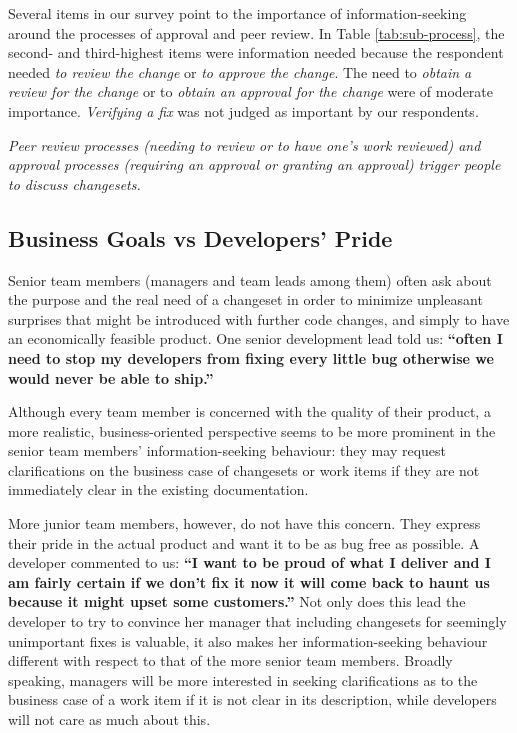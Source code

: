 \documentclass{sig-alternate}
\newenvironment{note}%
{\medskip
\noindent
\vspace{2pt}
\let\emph=\textbf
\begin{boxedminipage}{.99\columnwidth}\em}%
{\end{boxedminipage}}
\begin{document}
Several items in our survey point to the importance of information-seeking around the processes of approval and peer review. In Table \ref{tab:sub-process}, the second- and third-highest items were information needed because the respondent needed \emph{to review the change} or \emph{to approve the change}. The need to  \emph{obtain a review for the change} or to \emph{obtain an approval for the change} were of moderate importance. \emph{Verifying a fix} was not judged as important by our respondents.

\begin{note}
Peer review processes (needing to review or to have one's work reviewed) and approval processes (requiring an approval or granting an approval) trigger people to discuss changesets.
\end{note}


\subsection{Business Goals vs Developers' Pride}

Senior team members (managers and team leads among them) often ask about the purpose and the real need of a changeset in order to minimize unpleasant surprises that might be introduced with further code changes, and simply to have an economically feasible product. One senior development lead told us: \emph{``often I need to stop my developers from fixing every little bug otherwise we would never be able to ship.''}

Although every team member is concerned with the quality of their product, a more realistic, business-oriented perspective seems to be more prominent in the senior team members' information-seeking behaviour: they may request clarifications on the business case of changesets or work items if they are not immediately clear in the existing documentation.

More junior team members, however, do not have this concern. They express their pride in the actual product and want it to be as bug free as possible. A developer commented to us: \emph{``I want to be proud of what I deliver and I am fairly certain if we don't fix it now it will come back to haunt us because it might upset some customers.''} Not only does this lead the developer to try to convince her manager that including changesets for seemingly unimportant fixes is valuable, it also makes her information-seeking behaviour different with respect to that of the more senior team members. Broadly speaking, managers will be more interested in seeking clarifications as to the business case of a work item if it is not clear in its description, while developers will not care as much about this.
\end{document}
